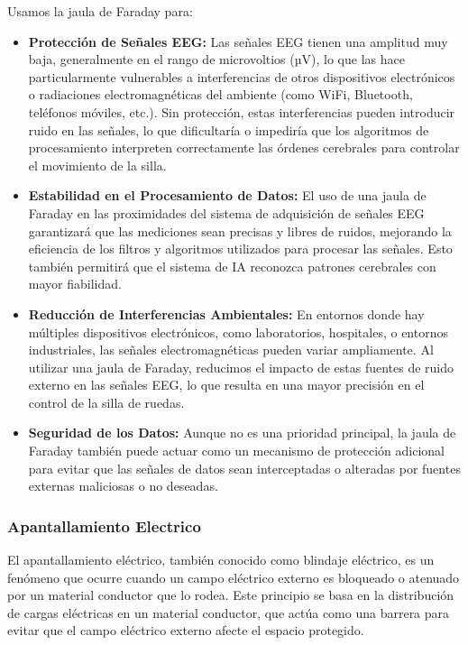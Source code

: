 \documentclass{article}
\begin{document}
\newpage
Usamos la jaula de Faraday para:
\begin{itemize}
    \item \textbf{Protección de Señales EEG:} Las señales EEG tienen una amplitud muy baja, generalmente en el rango de microvoltios (µV), lo que las hace particularmente vulnerables a interferencias de otros dispositivos electrónicos o radiaciones electromagnéticas del ambiente (como WiFi, Bluetooth, teléfonos móviles, etc.). Sin protección, estas interferencias pueden introducir ruido en las señales, lo que dificultaría o impediría que los algoritmos de procesamiento interpreten correctamente las órdenes cerebrales para controlar el movimiento de la silla.
    \item \textbf{Estabilidad en el Procesamiento de Datos:} El uso de una jaula de Faraday en las proximidades del sistema de adquisición de señales EEG garantizará que las mediciones sean precisas y libres de ruidos, mejorando la eficiencia de los filtros y algoritmos utilizados para procesar las señales. Esto también permitirá que el sistema de IA reconozca patrones cerebrales con mayor fiabilidad.
    \item \textbf{Reducción de Interferencias Ambientales:} En entornos donde hay múltiples dispositivos electrónicos, como laboratorios, hospitales, o entornos industriales, las señales electromagnéticas pueden variar ampliamente. Al utilizar una jaula de Faraday, reducimos el impacto de estas fuentes de ruido externo en las señales EEG, lo que resulta en una mayor precisión en el control de la silla de ruedas.
    \item \textbf{Seguridad de los Datos:} Aunque no es una prioridad principal, la jaula de Faraday también puede actuar como un mecanismo de protección adicional para evitar que las señales de datos sean interceptadas o alteradas por fuentes externas maliciosas o no deseadas.
\end{itemize}

\subsubsection{Apantallamiento Electrico}
El apantallamiento eléctrico, también conocido como blindaje eléctrico, es un fenómeno que ocurre cuando un campo eléctrico externo es bloqueado o atenuado por un material conductor que lo rodea. Este principio se basa en la distribución de cargas eléctricas en un material conductor, que actúa como una barrera para evitar que el campo eléctrico externo afecte el espacio protegido.
\end{document}
